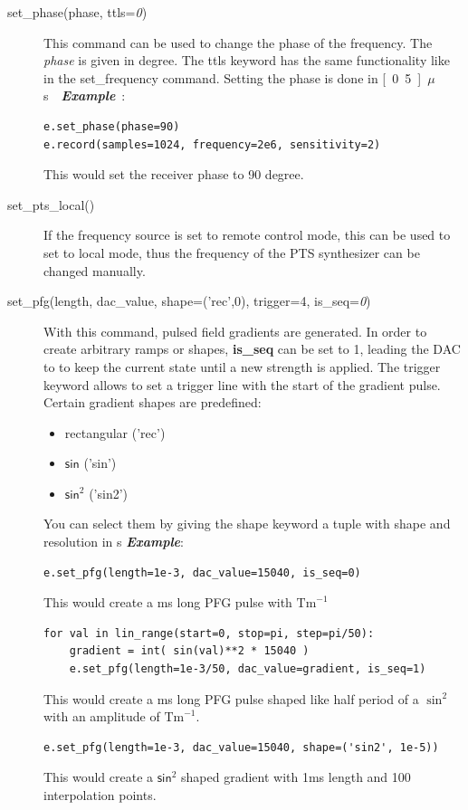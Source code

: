 \documentclass[12pt, a4paper, BCOR10mm, twoside, titlepage, headinclude]{scrbook}
\begin{document}
\begin{description}
\item[set\_phase(phase, ttls=\textit{0})]
This command can be used to change the phase of the frequency. The \textit{phase} is given in degree. The \textsf{ttls} keyword has the same functionality like in the set\_frequency command. Setting the phase is done  in \unit[0.5]{$\mu$s}
\newline
\emph{\textbf{Example}}:
\begin{lstlisting}
e.set_phase(phase=90)
e.record(samples=1024, frequency=2e6, sensitivity=2)
\end{lstlisting}
This would set the receiver phase to 90 degree.
\item[set\_pts\_local()]
If the frequency source is set to remote control mode, this can be used to set to local mode, thus the frequency of the PTS synthesizer can be changed manually.
\item[set\_pfg(length, dac\_value, shape=('rec',0), trigger=4, is\_seq=\textit{0})]
With this command, pulsed field gradients are generated. In order to create arbitrary ramps or shapes, \textbf{is\_seq} can be set to 1, leading the DAC to to keep the current state until a new strength is applied.
The trigger keyword allows to set a trigger line with the start of the gradient pulse.
Certain gradient shapes are predefined:
\begin{itemize}
\item rectangular ('rec')
\item $\mathsf{sin}$ ('sin')
\item $\mathsf{sin}^2$ ('sin2')
\end{itemize}
You can select them by giving the shape keyword a tuple with shape and resolution in s
\emph{\textbf{Example}}:
\begin{lstlisting}
e.set_pfg(length=1e-3, dac_value=15040, is_seq=0)
\end{lstlisting}
This would create a \unit[1]{ms} long PFG pulse with \unit[1]{$\textrm{Tm}^{-1}$}
\begin{lstlisting}
for val in lin_range(start=0, stop=pi, step=pi/50):
	gradient = int( sin(val)**2 * 15040 )
	e.set_pfg(length=1e-3/50, dac_value=gradient, is_seq=1)
\end{lstlisting}
This would create a \unit[1]{ms} long PFG pulse shaped like half period of a $\sin^2$ with an amplitude of \unit[1]{$\textrm{Tm}^{-1}$}.

\begin{lstlisting}
e.set_pfg(length=1e-3, dac_value=15040, shape=('sin2', 1e-5))
\end{lstlisting}
This would create a  $\mathsf{sin}^2$ shaped gradient with 1ms length and 100 interpolation points.



\end{description}
\end{document}
